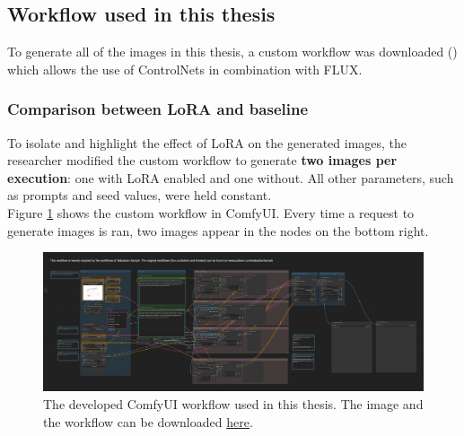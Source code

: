 \subsection{Workflow used in this thesis}
To generate all of the images in this thesis, a custom workflow was downloaded (\cite{sebastian_kamph_flux_2024}) which allows the use of ControlNets in combination with FLUX.
\subsubsection{Comparison between LoRA and baseline}
To isolate and highlight the effect of LoRA on the generated images, the researcher modified the custom workflow to generate \textbf{two images per execution}: one with LoRA enabled and one without. All other parameters, such as prompts and seed values, were held constant.\\
Figure \ref{fig:own comfy workflow} shows the custom workflow in ComfyUI. Every time a request to generate images is ran, two images appear in the nodes on the bottom right.\\ 
\begin{figure}[H]
    \centering
    \includegraphics[width=\linewidth]{Images/Methodology/workflow (5).png}
    \caption{The developed ComfyUI workflow used in this thesis. The image and the workflow can be downloaded \href{https://github.com/matijspeeters/Thesis_Lora/blob/7aaf540acbfc18f98d5cf12d135511dd9963f9fc/ComfyUI_workflow.png}{here}.}
    \label{fig:own comfy workflow}
\end{figure}